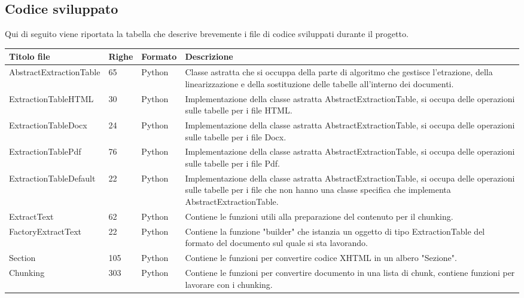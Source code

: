 \subsection{Codice sviluppato}
Qui di seguito viene riportata la tabella che descrive brevemente i file di codice sviluppati durante il progetto.
\begin{table}[H]
    \centering
    \begin{tabular}{|p{4cm} |p{1cm} | p{2cm} |p{6cm}|}
        \hline
        \textbf{Titolo file} & \textbf{Righe} & \textbf{Formato} & \textbf{Descrizione}\\
        \hline
        AbstractExtractionTable & 65 & Python & Classe astratta che si occuppa della parte di algoritmo che gestisce l'etrazione, della linearizzazione e della sostituzione delle tabelle all'interno dei documenti. \\
        \hline
        ExtractionTableHTML & 30 & Python & Implementazione della classe astratta AbstractExtractionTable, si occupa delle operazioni sulle tabelle per i file HTML. \\
        \hline
        ExtractionTableDocx & 24 & Python & Implementazione della classe astratta AbstractExtractionTable, si occupa delle operazioni sulle tabelle per i file Docx. \\
        \hline
        ExtractionTablePdf & 76 & Python & Implementazione della classe astratta AbstractExtractionTable, si occupa delle operazioni sulle tabelle per i file Pdf. \\
        \hline
        ExtractionTableDefault & 22 & Python & Implementazione della classe astratta AbstractExtractionTable, si occupa delle operazioni sulle tabelle per i file che non hanno una classe specifica che implementa AbstractExtractionTable. \\
        \hline
        ExtractText & 62 & Python & Contiene le funzioni utili alla preparazione del contenuto per il chunking. \\
        \hline
        FactoryExtractText & 22 & Python & Contiene la funzione "builder" che istanzia un oggetto di tipo ExtractionTable del formato del documento sul quale si sta lavorando. \\
        \hline 
        Section & 105 & Python & Contiene le funzioni per convertire codice XHTML in un albero "Sezione". \\
        \hline
        Chunking & 303 & Python & Contiene le funzioni per convertire documento in una lista di chunk, contiene funzioni per lavorare con i chunking. \\

\end{tabular}
\end{table}
